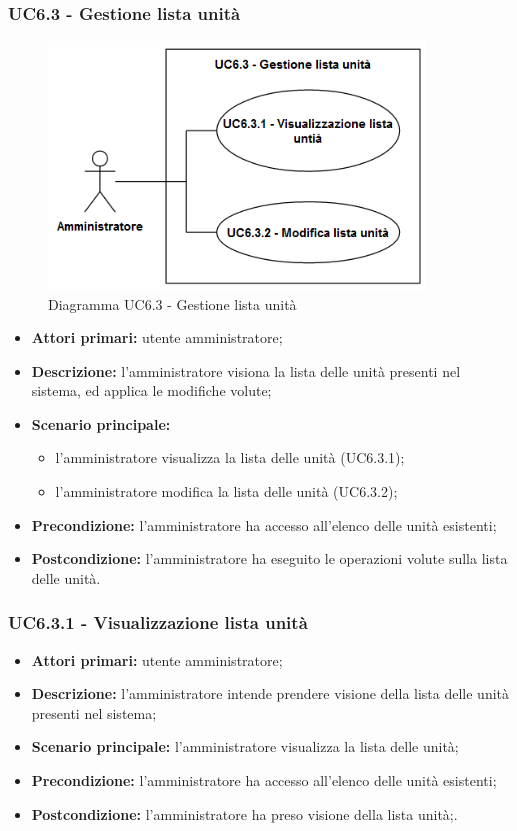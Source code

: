 \subsubsection{UC6.3 - Gestione lista unità}
	\begin{figure}[H]
		\centering
		\includegraphics[width=10cm]{images/UC6.3.png}
		\caption{Diagramma UC6.3 - Gestione lista unità}
	\end{figure}
	\begin{itemize}
		\item \textbf{Attori primari:} utente amministratore;
		\item \textbf{Descrizione:} l'amministratore visiona la lista delle unità presenti nel sistema, ed applica le modifiche volute;
		\item \textbf{Scenario principale:} 
			\begin{itemize}
				\item l'amministratore visualizza la lista delle unità (UC6.3.1);
				\item l'amministratore modifica la lista delle unità (UC6.3.2);
			\end{itemize}
		\item \textbf{Precondizione:} l'amministratore ha accesso all'elenco delle unità esistenti;
		\item \textbf{Postcondizione:} l'amministratore ha eseguito le operazioni volute sulla lista delle unità.
	\end{itemize}

\subsubsection{UC6.3.1 - Visualizzazione lista unità}
\begin{itemize}
	\item \textbf{Attori primari:} utente amministratore;
	\item \textbf{Descrizione:} l'amministratore intende prendere visione della lista delle unità presenti nel sistema;
	\item \textbf{Scenario principale:} l'amministratore visualizza la lista delle unità;
	\item \textbf{Precondizione:} l'amministratore ha accesso all'elenco delle unità esistenti;
	\item \textbf{Postcondizione:} l'amministratore ha preso visione della lista unità;.
\end{itemize}

